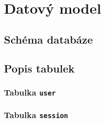 \section{Datový model}


\subsection{Schéma databáze}



\subsection{Popis tabulek}


\subsubsection{Tabulka \texttt{user}}

\subsubsection{Tabulka \texttt{session}}

